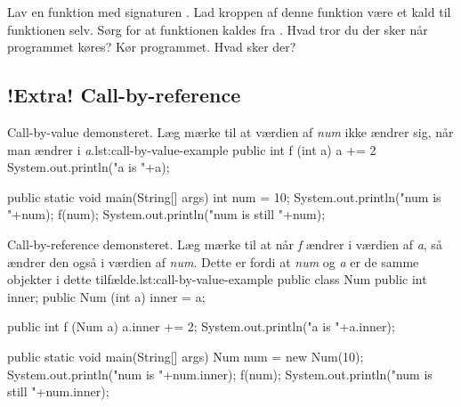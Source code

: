 
        \begin{exercise}
            Lav en funktion med signaturen . Lad
            kroppen af denne funktion være et kald til funktionen
            selv. Sørg for at funktionen kaldes fra .
            Hvad tror du der sker når programmet køres? Kør
            programmet. Hvad sker der?
        \end{exercise}

    \subsection{!Extra! Call-by-reference}



        \begin{JavaCode}{Call-by-value demonsteret. Læg mærke til at værdien af \emph{num} ikke ændrer sig, når man ændrer i \emph{a}.}{lst:call-by-value-example}
            public int f (int a) {
                a += 2
                System.out.println("a is "+a);
            }

            public static void main(String[] args) {
                int num = 10;
                System.out.println("num is "+num);
                f(num);
                System.out.println("num is still "+num);
            }
        \end{JavaCode}

        \begin{JavaCode}{Call-by-reference demonsteret. Læg mærke til at når \emph{f} ændrer i værdien af \emph{a}, så ændrer den også i værdien af \emph{num}. Dette er fordi at \emph{num} og \emph{a} er de samme objekter i dette tilfælde.}{lst:call-by-value-example}
            public class Num {
                public int inner;
                public Num (int a) { inner = a; }
            }

            public int f (Num a) {
                a.inner += 2;
                System.out.println("a is "+a.inner);
            }

            public static void main(String[] args) {
                Num num = new Num(10);
                System.out.println("num is "+num.inner);
                f(num);
                System.out.println("num is still "+num.inner);
            }
        \end{JavaCode}

